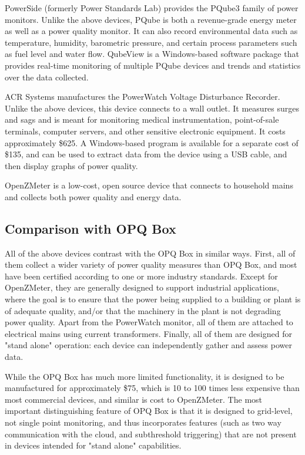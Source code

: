 PowerSide (formerly Power Standards Lab) \cite{powerside_powerside_2020} provides the PQube3 family of power monitors. Unlike the above devices, PQube is both a revenue-grade energy meter as well as a power quality monitor. It can also record environmental data such as temperature, humidity, barometric pressure, and certain process parameters such as fuel level and water flow. QubeView is a Windows-based software package that provides real-time monitoring of multiple PQube devices and trends and statistics over the data collected.

ACR Systems \cite{acr_acr_2020} manufactures the PowerWatch Voltage Disturbance Recorder. Unlike the above devices, this device connects to a wall outlet. It measures surges and sags and is meant for monitoring medical instrumentation, point-of-sale terminals, computer servers, and other sensitive electronic equipment. It costs approximately \$625. A Windows-based program is available for a separate cost of \$135, and can be used to extract data from the device using a USB cable, and then display graphs of power quality.

OpenZMeter \cite{viciana_openzmeter_2018} is a low-cost, open source device that connects to household mains and collects both power quality and energy data.

\subsection*{Comparison with OPQ Box}

All of the above devices contrast with the OPQ Box in similar ways. First, all of them collect a wider variety of power quality measures than OPQ Box, and most have been certified according to one or more industry standards. Except for OpenZMeter, they are generally designed to support industrial applications, where the goal is to ensure that the power being supplied to a building or plant is of adequate quality, and/or that the machinery in the plant is not degrading power quality. Apart from the PowerWatch monitor, all of them are attached to electrical mains using current transformers. Finally, all of them are designed for "stand alone" operation: each device can independently gather and assess power data.

While the OPQ Box has much more limited functionality, it is designed to be manufactured for approximately \$75, which is 10 to 100 times less expensive than most commercial devices, and similar is cost to OpenZMeter. The most important distinguishing feature of OPQ Box is that it is designed to grid-level, not single point monitoring, and thus incorporates features (such as two way communication with the cloud, and subthreshold triggering) that are not present in devices intended for "stand alone" capabilities.

